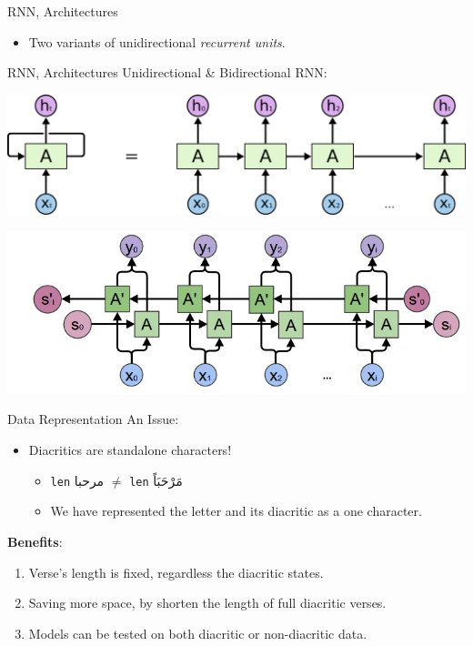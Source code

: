 \documentclass[10pt]{beamer}
\begin{document}
\begin{frame}[fragile]{RNN, Architectures}

\begin{center}
    
\end{center}
\begin{itemize}
    \item Two variants of unidirectional \textit{recurrent units}.
\end{itemize}
\end{frame}

\begin{frame}[fragile]{RNN, Architectures}
Unidirectional \& Bidirectional RNN:
\begin{center}
\includegraphics[scale=0.3]{uni_rnn}
\end{center}

\begin{center}
\includegraphics[scale=0.3]{bi}
\end{center}
\end{frame}

\begin{frame}[fragile]{Data Representation}
An Issue:
\begin{itemize}
    \item Diacritics are standalone characters!
    \begin{itemize}
        \item \texttt{len} \textarabic{مرحبا} $\neq$ \texttt{len} \textarabic{مَرْحَبَاً}
        \item We have represented the letter and its diacritic as a \alert{one
character}.
    \end{itemize}
\end{itemize}
\textbf{Benefits}:
\begin{enumerate}
    \item Verse's length is fixed, regardless the diacritic states.
    \item Saving more space, by shorten the length of full diacritic verses. 
    \item Models can be tested on both diacritic or non-diacritic data.
\end{enumerate}
\end{frame}
\end{document}
